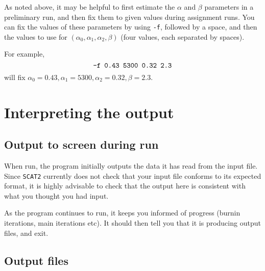 \documentclass[11pt,titlepage,times,letterpaper]{article}
\def\SCAT{{\tt SCAT2} }
\begin{document}
As noted above, it may be helpful to first estimate the $\alpha$ and
$\beta$ parameters in a preliminary run, and then fix them to given
values during assignment runs. You can fix the values of these
parameters by using {\tt -f}, followed by a space, and then the values
to use for $(\alpha_0,\alpha_1,\alpha_2,\beta)$ (four values, each
separated by spaces).

For example,
$$\text{\tt -f 0.43 5300 0.32 2.3}$$ will fix $\alpha_0 = 0.43, \alpha_1 =
5300, \alpha_2 = 0.32, \beta = 2.3$.





\section{Interpreting the output} \label{interpret}

\subsection{Output to screen during run}

When run, the program initially outputs the data it has read from the
input file. Since \SCAT currently does not check that your input file
conforms to its expected format, it is highly advisable to check that
the output here is consistent with what you thought you had input.

As the program continues to run, it keeps you informed of progress
(burnin iterations, main iterations etc). It should then tell you
that it is producing output files, and exit.

\subsection{Output files} \label{out}
\end{document}
